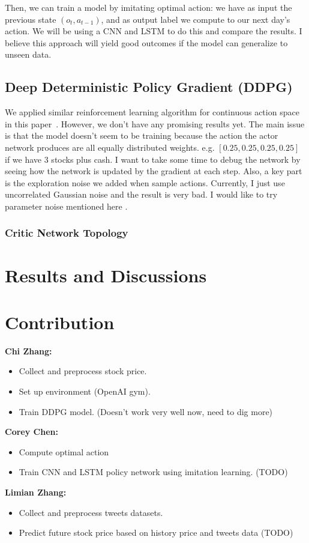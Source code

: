 \documentclass[a4paper, 10pt]{article}
\begin{document}
\begin{spacing}{1.2}
    Then, we can train a model by imitating optimal action: we have as input the previous state $(o_t, a_{t-1})$, and as output label we compute to our next day's action. We will be using a CNN and LSTM to do this and compare the results. I believe this approach will yield good outcomes if the model can generalize to unseen data.
    
    \subsection{Deep Deterministic Policy Gradient (DDPG)}
    We applied similar reinforcement learning algorithm for continuous action space in this paper~\cite{DBLP:journals/corr/LillicrapHPHETS15}. However, we don't have any promising results yet. The main issue is that the model doesn't seem to be training because the action the actor network produces are all equally distributed weights. e.g. $[0.25, 0.25, 0.25, 0.25]$ if we have 3 stocks plus cash. I want to take some time to debug the network by seeing how the network is updated by the gradient at each step. Also, a key part is the exploration noise we added when sample actions. Currently, I just use uncorrelated Gaussian noise and the result is very bad. I would like to try parameter noise mentioned here \cite{DBLP:journals/corr/PlappertHDSCCAA17}. 
    
    
    \subsubsection{Critic Network Topology}
   
    
    
    \section{Results and Discussions}
    
    \section{Contribution}
    \textbf{Chi Zhang:} 
    \begin{itemize}
      \item Collect and preprocess stock price.
      \item Set up environment (OpenAI gym).
      \item Train DDPG model. (Doesn't work very well now, need to dig more)
    \end{itemize}
    \textbf{Corey Chen:}
    \begin{itemize}
      \item Compute optimal action
      \item Train CNN and LSTM policy network using imitation learning. (TODO)
    \end{itemize}
    \textbf{Limian Zhang:}
    \begin{itemize}
      \item Collect and preprocess tweets datasets.
      \item Predict future stock price based on history price and tweets data (TODO)
    \end{itemize}
    

\end{spacing}
\end{document}
